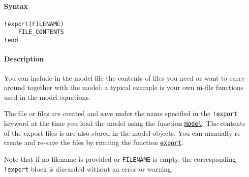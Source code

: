 


	\paragraph{Syntax}\label{syntax}

\begin{verbatim}
!export(FILENAME)
    FILE_CONTENTS
!end
\end{verbatim}

\paragraph{Description}\label{description}

You can include in the model file the contents of files you need or want
to carry around together with the model; a typical example is your own
m-file functions used in the model equations.

The file or files are created and save under the name specified in the
\texttt{!export} keyword at the time you load the model using the
function \href{model/model}{\texttt{model}}. The contents of the export
files is are also stored in the model objects. You can manually
re-create and re-save the files by running the function
\href{model/export}{\texttt{export}}.

Note that if no filename is provided or \texttt{FILENAME} is empty, the
corresponding \texttt{!export} block is discarded without an error or
warning.


